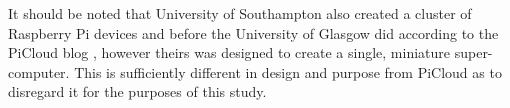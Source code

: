 \label{intro:pisupercomp}

It should be noted that University of Southampton also created a cluster of Raspberry Pi devices and before the University of Glasgow did according to the PiCloud blog \citep{picloudblog}, however theirs was designed to create a single, miniature super-computer.
This is sufficiently different in design and purpose from PiCloud as to disregard it for the purposes of this study.